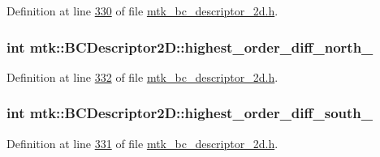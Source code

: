 Definition at line \hyperlink{mtk__bc__descriptor__2d_8h_source_l00330}{330} of file \hyperlink{mtk__bc__descriptor__2d_8h_source}{mtk\+\_\+bc\+\_\+descriptor\+\_\+2d.\+h}.

\hypertarget{classmtk_1_1BCDescriptor2D_a6cdeefe70f5bef93196f34ab2949cad2}{
\subsubsection[{highest\+\_\+order\+\_\+diff\+\_\+north\+\_\+}]{\setlength{\rightskip}{0pt plus 5cm}int mtk\+::\+B\+C\+Descriptor2\+D\+::highest\+\_\+order\+\_\+diff\+\_\+north\+\_\+\hspace{0.3cm}{\ttfamily [private]}}}\label{classmtk_1_1BCDescriptor2D_a6cdeefe70f5bef93196f34ab2949cad2}


Definition at line \hyperlink{mtk__bc__descriptor__2d_8h_source_l00332}{332} of file \hyperlink{mtk__bc__descriptor__2d_8h_source}{mtk\+\_\+bc\+\_\+descriptor\+\_\+2d.\+h}.

\hypertarget{classmtk_1_1BCDescriptor2D_a1fb094e5e53ecfba32fe9fe56c051c47}{
\subsubsection[{highest\+\_\+order\+\_\+diff\+\_\+south\+\_\+}]{\setlength{\rightskip}{0pt plus 5cm}int mtk\+::\+B\+C\+Descriptor2\+D\+::highest\+\_\+order\+\_\+diff\+\_\+south\+\_\+\hspace{0.3cm}{\ttfamily [private]}}}\label{classmtk_1_1BCDescriptor2D_a1fb094e5e53ecfba32fe9fe56c051c47}


Definition at line \hyperlink{mtk__bc__descriptor__2d_8h_source_l00331}{331} of file \hyperlink{mtk__bc__descriptor__2d_8h_source}{mtk\+\_\+bc\+\_\+descriptor\+\_\+2d.\+h}.

